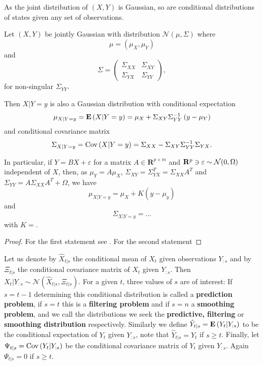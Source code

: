 As the joint distribution of $(X, Y)$ is Gaussian, so are conditional distributions of states given any set of observations.

\begin{lemma}
    \label{lem:gaussian_conditional}
    Let $(X,Y)$ be jointly Gaussian with distribution $\mathcal N \left( \mu, \Sigma \right)$ where 
    $$
    \mu = \left(\mu_{X}, \mu_{Y}\right)
    $$
    and 
    $$
    \Sigma = \begin{pmatrix}
        \Sigma_{XX} & \Sigma_{XY} \\
        \Sigma_{YX} & \Sigma_{YY}
    \end{pmatrix},
    $$
    for non-singular $\Sigma_{YY}$. 
    
    Then $X|Y = y$ is also a Gaussian distribution with conditional expectation
    $$
    \mu_{X|Y = y} = \mathbf E \left( X | Y = y \right) = \mu_{X} + \Sigma_{XY}\Sigma_{YY}^{-1} \left( y - \mu_{Y} \right)
    $$
    and conditional covariance matrix 
    $$
    \Sigma_{X| Y =y} = \text{Cov} \left( X | Y = y \right) = \Sigma_{XX} - \Sigma_{XY} \Sigma_{YY}^{-1} \Sigma_{YX}.
    $$
    
    In particular, if $Y = BX + \varepsilon$ for a matrix $A \in \mathbf R^{p\times m}$ and $\mathbf R^{p} \ni \varepsilon \sim \mathcal N(0, \Omega)$ independent of $X$, then, as 
    $\mu_Y = A \mu_{X}$, $\Sigma_{XY} = \Sigma_{YX}^T = \Sigma_{XX}A^{T}$ and $\Sigma_{YY} = A \Sigma_{XX} A^{T} + \Omega$, we have
    $$
        \mu_{X|Y = y} = \mu_{X} + K (y - \mu_{y})
    $$
    and 
    $$
    \Sigma_{X|Y = y} = \dots
    $$
    with $K = $.
\end{lemma}
\begin{proof}
    For the first statement see \cite[Chapter 4, Lemma 1]{Durbin2012Time}. For the second statement 
\end{proof}

Let us denote by $\hat X_{t | s}$ the conditional mean of $X_{t}$ given observations $Y_{:s}$ and by $\Xi_{t | s}$ the conditional covariance matrix of $X_{t}$ given $Y_{:s}$. Then $X_{t} | Y_{:s} \sim \mathcal N \left( \hat X_{t|s}, \Xi_{t|s} \right)$. For a given $t$, three values of $s$ are of interest: If $s = t - 1$ determining this conditional distribution is called a \textbf{prediction problem}, if $s = t$ this is a \textbf{filtering problem} and if $s = n$ a \textbf{smoothing problem}, and we call the distributions we seek the \textbf{predictive, filtering} or \textbf{smoothing distribution} respectively. 
Similarly we define $\hat Y_{t|s} = \mathbf E \left( Y_{t} \middle| Y_{:s} \right)$ to be the conditional expectation of $Y_{t}$ given $Y_{:s}$, note that $\hat Y_{t|s} = Y_{t}$ if $s \geq t$. Finally, let $\Psi_{t|s} = \text{Cov} \left( Y_{t} | Y_{:s} \right)$ be the conditional covariance matrix of $Y_{t}$ given $Y_{:s}$. Again $\Psi_{t|s} = 0$ if $s \geq t$. 

